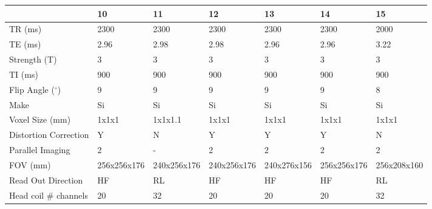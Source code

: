 \begin{table}
\centering
\iflatexml
\begin{tabular}{lllllll}
\toprule
{} & 10 & 11 & 12 & 13 & 14 & 15 \\
\midrule
TR (ms)                   &                 2300 &                 2300 &               2300 &                2300 &                2300 &                2000 \\
TE (ms)                   &                 2.96 &                 2.98 &               2.98 &                2.96 &                2.96 &                3.22 \\
Strength (T)              &                    3 &                    3 &                  3 &                   3 &                   3 &                   3 \\
TI (ms)                   &                  900 &                  900 &                900 &                 900 &                 900 &                 900 \\
Flip Angle ($^\circ$)            &                    9 &                    9 &                  9 &                   9 &                   9 &                   8 \\
Make                  &                   Si &                   Si &                 Si &                  Si &                  Si &                  Si \\
Voxel Size (mm)            &                1x1x1 &              1x1x1.1 &              1x1x1 &               1x1x1 &               1x1x1 &               1x1x1 \\
Distortion Correction &                    Y &                    N &                  Y &                   Y &                   Y &                   N \\
Parallel Imaging      &                    2 &                    - &                  2 &                   2 &                   2 &                   2 \\
FOV (mm)                  &          256x256x176 &          240x256x176 &        240x256x176 &         240x276x156 &         256x256x176 &         256x208x160 \\
Read Out Direction    &                   HF &                   RL &                 HF &                  HF &                  HF &                  RL \\
Head coil \# channels  &                   20 &                   32 &                 20 &                  20 &                  20 &                  32 \\

\end{tabular}
\end{table}
